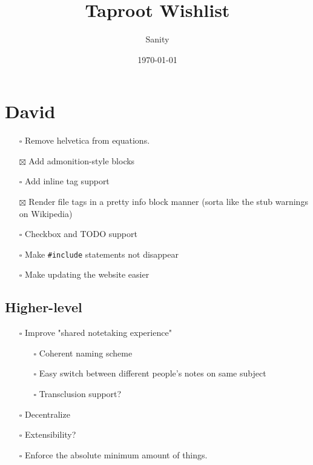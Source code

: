 \documentclass[letterpaper]{article}
\author{Sanity}
\date{\today}
\title{Taproot Wishlist}
\renewcommand{\tableofcontents}{}
\begin{document}
\tableofcontents


\section{David}
\label{sec:orgbcb8176}
\begin{itemize}
\item[{$\square$}] Remove helvetica from equations.
\item[{$\boxtimes$}] Add admonition-style blocks
\item[{$\square$}] Add inline tag support
\item[{$\boxtimes$}] Render file tags in a pretty info block manner (sorta like the stub warnings on Wikipedia)
\item[{$\square$}] Checkbox and TODO support
\item[{$\square$}] Make \texttt{\#include} statements not disappear
\item[{$\square$}] Make updating the website easier
\end{itemize}
\subsection{Higher-level}
\label{sec:orga30caf4}
\begin{itemize}
\item[{$\square$}] Improve "shared notetaking experience"
\begin{itemize}
\item[{$\square$}] Coherent naming scheme
\item[{$\square$}] Easy switch between different people's notes on same subject
\item[{$\square$}] Transclusion support?
\end{itemize}
\item[{$\square$}] Decentralize
\item[{$\square$}] Extensibility?
\item[{$\square$}] Enforce the absolute minimum amount of things.
\end{itemize}
\end{document}
